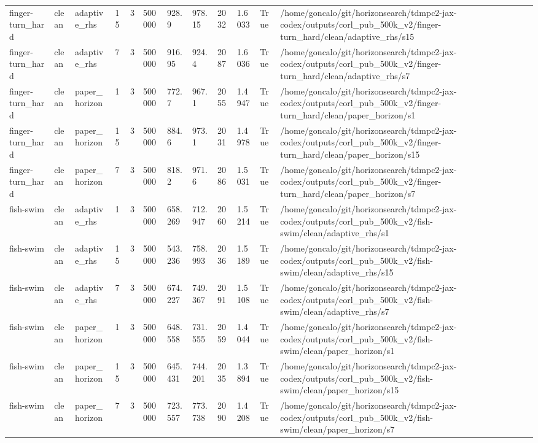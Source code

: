 \begin{tabular}{llllllllllll}
finger-turn\_hard & clean & adaptive\_rhs & 15 & 3 & 500000 & 928.9 & 978.15 & 2032 & 1.6033 & True & /home/goncalo/git/horizonsearch/tdmpc2-jax-codex/outputs/corl\_pub\_500k\_v2/finger-turn\_hard/clean/adaptive\_rhs/s15 \\
finger-turn\_hard & clean & adaptive\_rhs & 7 & 3 & 500000 & 916.95 & 924.4 & 2087 & 1.6036 & True & /home/goncalo/git/horizonsearch/tdmpc2-jax-codex/outputs/corl\_pub\_500k\_v2/finger-turn\_hard/clean/adaptive\_rhs/s7 \\
finger-turn\_hard & clean & paper\_horizon & 1 & 3 & 500000 & 772.7 & 967.1 & 2055 & 1.4947 & True & /home/goncalo/git/horizonsearch/tdmpc2-jax-codex/outputs/corl\_pub\_500k\_v2/finger-turn\_hard/clean/paper\_horizon/s1 \\
finger-turn\_hard & clean & paper\_horizon & 15 & 3 & 500000 & 884.6 & 973.1 & 2031 & 1.4978 & True & /home/goncalo/git/horizonsearch/tdmpc2-jax-codex/outputs/corl\_pub\_500k\_v2/finger-turn\_hard/clean/paper\_horizon/s15 \\
finger-turn\_hard & clean & paper\_horizon & 7 & 3 & 500000 & 818.2 & 971.6 & 2086 & 1.5031 & True & /home/goncalo/git/horizonsearch/tdmpc2-jax-codex/outputs/corl\_pub\_500k\_v2/finger-turn\_hard/clean/paper\_horizon/s7 \\
fish-swim & clean & adaptive\_rhs & 1 & 3 & 500000 & 658.269 & 712.947 & 2060 & 1.5214 & True & /home/goncalo/git/horizonsearch/tdmpc2-jax-codex/outputs/corl\_pub\_500k\_v2/fish-swim/clean/adaptive\_rhs/s1 \\
fish-swim & clean & adaptive\_rhs & 15 & 3 & 500000 & 543.236 & 758.993 & 2036 & 1.5189 & True & /home/goncalo/git/horizonsearch/tdmpc2-jax-codex/outputs/corl\_pub\_500k\_v2/fish-swim/clean/adaptive\_rhs/s15 \\
fish-swim & clean & adaptive\_rhs & 7 & 3 & 500000 & 674.227 & 749.367 & 2091 & 1.5108 & True & /home/goncalo/git/horizonsearch/tdmpc2-jax-codex/outputs/corl\_pub\_500k\_v2/fish-swim/clean/adaptive\_rhs/s7 \\
fish-swim & clean & paper\_horizon & 1 & 3 & 500000 & 648.558 & 731.555 & 2059 & 1.4044 & True & /home/goncalo/git/horizonsearch/tdmpc2-jax-codex/outputs/corl\_pub\_500k\_v2/fish-swim/clean/paper\_horizon/s1 \\
fish-swim & clean & paper\_horizon & 15 & 3 & 500000 & 645.431 & 744.201 & 2035 & 1.3894 & True & /home/goncalo/git/horizonsearch/tdmpc2-jax-codex/outputs/corl\_pub\_500k\_v2/fish-swim/clean/paper\_horizon/s15 \\
fish-swim & clean & paper\_horizon & 7 & 3 & 500000 & 723.557 & 773.738 & 2090 & 1.4208 & True & /home/goncalo/git/horizonsearch/tdmpc2-jax-codex/outputs/corl\_pub\_500k\_v2/fish-swim/clean/paper\_horizon/s7 \\

\end{tabular}
